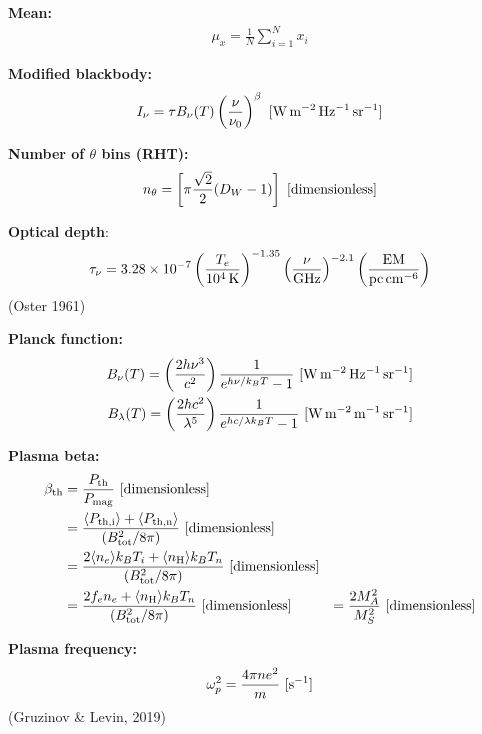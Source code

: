 \documentclass[a4paper,10pt]{article}
\begin{document}
{\noindent}\textbf{Mean:} 
\begin{align*}
    \mu_x = \frac{1}{N} \sum_{i=1}^N x_i
\end{align*}

{\noindent}\textbf{Modified blackbody:}
\begin{align*}
    I_\nu = \tau B_\nu(T) \left(\frac{\nu}{\nu_0}\right)^\beta ~ [{\rm W\,m^{-2}\,Hz^{-1}\,sr^{-1}}]
\end{align*}

{\noindent}\textbf{Number of $\theta$ bins (RHT):}
\begin{align*}
    n_\theta = \left[\pi\frac{\sqrt{2}}{2}(D_W-1)\right] ~ [{\rm dimensionless}]
\end{align*}

{\noindent}\textbf{Optical depth}:
\begin{align*}
    \tau_\nu = 3.28\times10^{-7} \left(\frac{T_e}{10^4\,{\rm K}}\right)^{-1.35} \left(\frac{\nu}{\rm GHz}\right)^{-2.1} \left(\frac{\rm EM}{\rm pc\,cm^{-6}}\right)
\end{align*}
(Oster 1961)

{\noindent}\textbf{Planck function:}
\begin{align*}
    B_\nu(T) = \left(\frac{2h\nu^3}{c^2}\right) \frac{1}{e^{h\nu/k_BT}-1} ~ [{\rm W\,m^{-2}\,Hz^{-1}\,sr^{-1}}] \\
    B_\lambda(T) = \left(\frac{2hc^2}{\lambda^5}\right) \frac{1}{e^{hc/\lambda k_BT}-1} ~ [{\rm W\,m^{-2}\,m^{-1}\,sr^{-1}}]
\end{align*}

{\noindent}\textbf{Plasma beta:} 
\begin{align*}
\beta_{\rm th} &= \frac{P_{\rm th}}{P_{\rm mag}} ~ [{\rm dimensionless}]\\
                      &= \frac{ \langle P_{\rm th,i}\rangle + \langle P_{\rm th,n}\rangle }{(B_{\rm tot}^2/8\pi)} ~ [{\rm dimensionless}] \\
                      &= \frac{2\langle n_e\rangle k_BT_i + \langle n_{\rm H}\rangle k_BT_n}{(B_{\rm tot}^2/8\pi)}  ~ [{\rm dimensionless}] \\
                      &= \frac{2f_en_e+ \langle n_{\rm H}\rangle k_BT_n}{(B_{\rm tot}^2/8\pi)}  ~ [{\rm dimensionless}]
                      &= \frac{2M_A^2}{M_S^2} ~ [{\rm dimensionless}]
\end{align*}

{\noindent}\textbf{Plasma frequency:}
\begin{align*}
	\omega_p^2 = \frac{4\pi ne^2}{m} ~ [{\rm s^{-1}}]
\end{align*}
(Gruzinov \& Levin, 2019)
\end{document}
